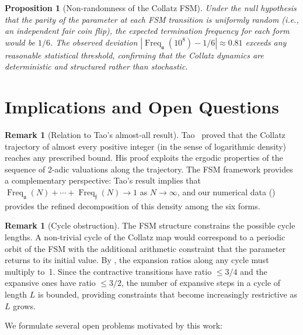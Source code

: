 \documentclass[11pt,a4paper]{article}
\theoremstyle{plain}
\newtheorem{proposition}[theorem]{Proposition}
\theoremstyle{definition}
\newtheorem{remark}[theorem]{Remark}
\DeclareMathOperator{\Freq}{Freq}
\begin{document}
\begin{proposition}[Non-randomness of the Collatz FSM]\label{prop:nonrandom}
  Under the null hypothesis that the parity of the parameter at each FSM transition is uniformly random (i.e., an independent fair coin flip), the expected termination frequency for each form would be $1/6$. The observed deviation $|\Freq_{\mathfrak{a}}(10^8) - 1/6| \approx 0.81$ exceeds any reasonable statistical threshold, confirming that the Collatz dynamics are deterministic and structured rather than stochastic.
\end{proposition}

\section{Implications and Open Questions}
\label{sec:open}

\begin{remark}[Relation to Tao's almost-all result]
  Tao~\cite{tao2022} proved that the Collatz trajectory of almost every positive integer (in the sense of logarithmic density) reaches any prescribed bound. His proof exploits the ergodic properties of the sequence of 2-adic valuations along the trajectory. The FSM framework provides a complementary perspective: Tao's result implies that $\Freq_{\mathfrak{a}}(N) + \cdots + \Freq_{\mathfrak{f}}(N) \to 1$ as $N \to \infty$, and our numerical data () provides the refined decomposition of this density among the six forms.
\end{remark}

\begin{remark}[Cycle obstruction]
  The FSM structure constrains the possible cycle lengths. A non-trivial cycle of the Collatz map would correspond to a periodic orbit of the FSM with the additional arithmetic constraint that the parameter returns to its initial value. By , the expansion ratios along any cycle must multiply to~1. Since the contractive transitions have ratio $\leq 3/4$ and the expansive ones have ratio $\leq 3/2$, the number of expansive steps in a cycle of length $L$ is bounded, providing constraints that become increasingly restrictive as $L$ grows.
\end{remark}

We formulate several open problems motivated by this work:
\end{document}

